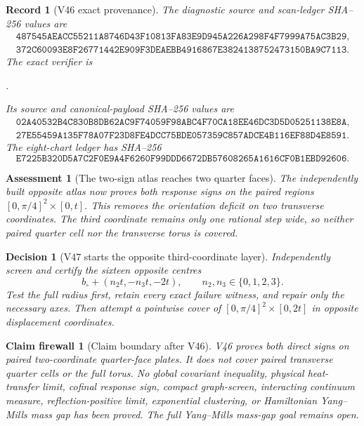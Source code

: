 \documentclass[11pt,oneside]{article}
\newtheorem{assessment}[theorem]{Assessment}
\newtheorem{firewall}[theorem]{Claim firewall}
\newtheorem{record}[theorem]{Record}
\newtheorem{decision}[theorem]{Decision}
\theoremstyle{definition}
\theoremstyle{remark}
\begin{document}
\begin{record}[V46 exact provenance]
\label{rec:newv46-provenance}
The diagnostic source and scan-ledger SHA--256 values are
\[
\begin{gathered}
\texttt{487545AEACC55211A8746D43F10813FA83E9D945A226A298F4F7999A75AC3B29},\\
\texttt{372C60093E8F26771442E909F3DEAEBB4916867E3824138752473150BA9C7113}.
\end{gathered}                                         \tag{46.11}
\]
The exact verifier is
\begin{center}
\footnotesize
{}.
\end{center}
Its source and canonical-payload SHA--256 values are
\[
\begin{gathered}
\texttt{02A40532B4C830B8DB62AC9F74059F98ABC4F70CA18EE46DC3D5D05251138E8A},\\
\texttt{27E55459A135F78A07F23D8FE4DCC75BDE057359C857ADCE4B116EF88D4E8591}.
\end{gathered}                                         \tag{46.12}
\]
The eight-chart ledger has SHA--256
\[
\texttt{E7225B320D5A7C2F0E9A4F6260F99DDD6672DB57608265A1616CF0B1EBD92606}.
                                                               \tag{46.13}
\]
\end{record}

\begin{assessment}[The two-sign atlas reaches two quarter faces]
\label{ass:newv46}
The independently built opposite atlas now proves both response
signs on the paired regions
\([0,\pi/4]^2\times[0,t]\).  This removes the orientation deficit
on two transverse coordinates.  The third coordinate remains only
one rational step wide, so neither paired quarter cell nor the
transverse torus is covered.
\end{assessment}

\begin{decision}[V47 starts the opposite third-coordinate layer]
\label{dec:newv46-next}
Independently screen and certify the sixteen opposite centres
\[
 b_\circ+(n_2t,-n_3t,-2t),
 \qquad n_2,n_3\in\{0,1,2,3\}.                         \tag{46.14}
\]
Test the full radius first, retain every exact failure witness, and
repair only the necessary axes.  Then attempt a pointwise cover of
\([0,\pi/4]^2\times[0,2t]\) in opposite displacement coordinates.
\end{decision}

\begin{firewall}[Claim boundary after V46]
\label{fire:newv46-final}
V46 proves both direct signs on paired two-coordinate quarter-face
plates.  It does not cover paired transverse quarter cells or the
full torus.  No global covariant inequality, physical heat-transfer
limit, cofinal response sign, compact graph-screen, interacting
continuum measure, reflection-positive limit, exponential
clustering, or Hamiltonian Yang--Mills mass gap has been proved.
The full Yang--Mills mass-gap goal remains open.
\end{firewall}
\end{document}

